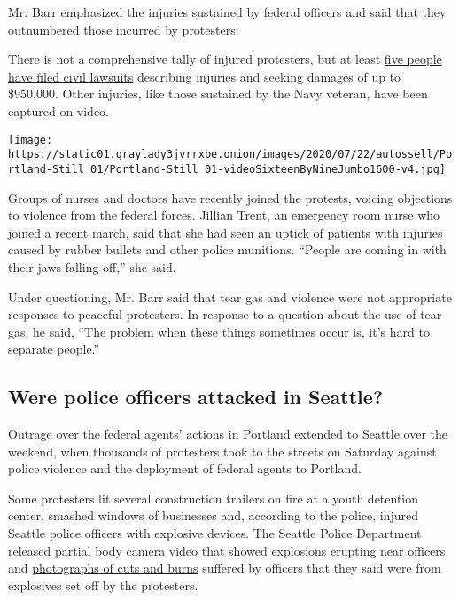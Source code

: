 Mr. Barr emphasized the injuries sustained by federal officers and said
that they outnumbered those incurred by protesters.

There is not a comprehensive tally of injured protesters, but at least
\href{https://www.opb.org/news/article/portland-protesters-lawsuits-police-brutality/}{five
people have filed civil lawsuits} describing injuries and seeking
damages of up to \$950,000. Other injuries, like those sustained by the
Navy veteran, have been captured on video.

\texttt{[image: https://static01.graylady3jvrrxbe.onion/images/2020/07/22/autossell/Portland-Still\_01/Portland-Still\_01-videoSixteenByNineJumbo1600-v4.jpg]}

Groups of nurses and doctors have recently joined the protests, voicing
objections to violence from the federal forces. Jillian Trent, an
emergency room nurse who joined a recent march, said that she had seen
an uptick of patients with injuries caused by rubber bullets and other
police munitions. ``People are coming in with their jaws falling off,''
she said.

Under questioning, Mr. Barr said that tear gas and violence were not
appropriate responses to peaceful protesters. In response to a question
about the use of tear gas, he said, ``The problem when these things
sometimes occur is, it's hard to separate people.''

\hypertarget{were-police-officers-attacked-in-seattle}{%
\subsection{Were police officers attacked in
Seattle?}\label{were-police-officers-attacked-in-seattle}}

Outrage over the federal agents' actions in Portland extended to Seattle
over the weekend, when thousands of protesters took to the streets on
Saturday against police violence and the deployment of federal agents to
Portland.

Some protesters lit several construction trailers on fire at a youth
detention center, smashed windows of businesses and, according to the
police, injured Seattle police officers with explosive devices. The
Seattle Police Department
\href{https://www.youtube.com/watch?v=zF-I2OyGD_A}{released partial body
camera video} that showed explosions erupting near officers and
\href{https://spdblotter.seattle.gov/2020/07/26/officer-injuries-precinct-damage-arrest-updates/}{photographs
of cuts and burns} suffered by officers that they said were from
explosives set off by the protesters.


